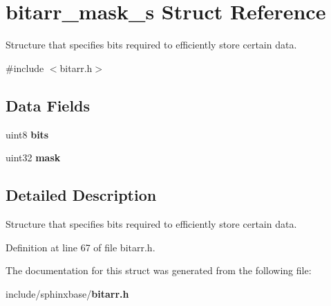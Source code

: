 \section{bitarr\-\_\-mask\-\_\-s Struct Reference}
\label{structbitarr__mask__s}


Structure that specifies bits required to efficiently store certain data.  




{\ttfamily \#include $<$bitarr.\-h$>$}

\subsection*{Data Fields}
\begin{DoxyCompactItemize}
\item 
uint8 {\bfseries bits}\label{structbitarr__mask__s_a47b05f707efd5233f021bb1276c79b7a}

\item 
uint32 {\bfseries mask}\label{structbitarr__mask__s_a034b318c56cbc15befef989a2521623c}

\end{DoxyCompactItemize}


\subsection{Detailed Description}
Structure that specifies bits required to efficiently store certain data. 

Definition at line 67 of file bitarr.\-h.



The documentation for this struct was generated from the following file\-:\begin{DoxyCompactItemize}
\item 
include/sphinxbase/{\bf bitarr.\-h}\end{DoxyCompactItemize}
